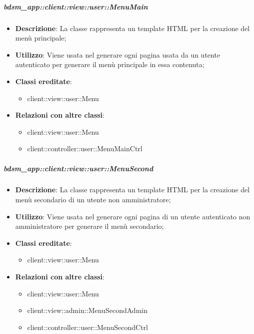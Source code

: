 		\subparagraph{bdsm\_app::client::view::user::MenuMain} %
		\label{subp:bdsm_app_client_view_user_menumain}
			\begin{itemize}
				\item \textbf{Descrizione}: La classe rappresenta un template HTML per la creazione del menù principale;
				\item \textbf{Utilizzo}: Viene usata nel generare ogni pagina usata da un utente autenticato per generare il menù principale in essa contenuta;
				\item \textbf{Classi ereditate}:
					\begin{itemize}
						\item client::view::user::Menu
					\end{itemize}
				\item \textbf{Relazioni con altre classi}:
					\begin{itemize}
						\item client::view::user::Menu
						\item client::controller::user::MenuMainCtrl
					\end{itemize}
			\end{itemize}

		\subparagraph{bdsm\_app::client::view::user::MenuSecond} %
		\label{subp:bdsm_app_client_view_user_menusecond}
			\begin{itemize}
				\item \textbf{Descrizione}: La classe rappresenta un template HTML per la creazione del menù secondario di un utente non amministratore;
				\item \textbf{Utilizzo}: Viene usata nel generare ogni pagina di un utente autenticato non amministratore per generare il menù secondario;
				\item \textbf{Classi ereditate}:
					\begin{itemize}
						\item client::view::user::Menu
					\end{itemize}
				\item \textbf{Relazioni con altre classi}:
					\begin{itemize}
						\item client::view::user::Menu
						\item client::view::admin::MenuSecondAdmin
						\item client::controller::user::MenuSecondCtrl
					\end{itemize}
			\end{itemize}

